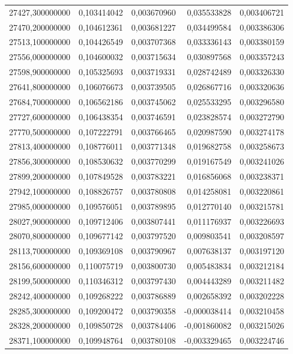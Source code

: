\begin{longtable}{rrrrr}
27427,300000000 & 0,103414042 & 0,003670960 & 0,035533828 & 0,003406721\\
27470,200000000 & 0,104612361 & 0,003681227 & 0,034499584 & 0,003386306\\
27513,100000000 & 0,104426549 & 0,003707368 & 0,033336143 & 0,003380159\\
27556,000000000 & 0,104600032 & 0,003715634 & 0,030897568 & 0,003357243\\
27598,900000000 & 0,105325693 & 0,003719331 & 0,028742489 & 0,003326330\\
27641,800000000 & 0,106076673 & 0,003739505 & 0,026867716 & 0,003320636\\
27684,700000000 & 0,106562186 & 0,003745062 & 0,025533295 & 0,003296580\\
27727,600000000 & 0,106438354 & 0,003746591 & 0,023828574 & 0,003272790\\
27770,500000000 & 0,107222791 & 0,003766465 & 0,020987590 & 0,003274178\\
27813,400000000 & 0,108776011 & 0,003771348 & 0,019682758 & 0,003258673\\
27856,300000000 & 0,108530632 & 0,003770299 & 0,019167549 & 0,003241026\\
27899,200000000 & 0,107849528 & 0,003783221 & 0,016856068 & 0,003238371\\
27942,100000000 & 0,108826757 & 0,003780808 & 0,014258081 & 0,003220861\\
27985,000000000 & 0,109576051 & 0,003789895 & 0,012770140 & 0,003215781\\
28027,900000000 & 0,109712406 & 0,003807441 & 0,011176937 & 0,003226693\\
28070,800000000 & 0,109677142 & 0,003797520 & 0,009803541 & 0,003208597\\
28113,700000000 & 0,109369108 & 0,003790967 & 0,007638137 & 0,003197120\\
28156,600000000 & 0,110075719 & 0,003800730 & 0,005483834 & 0,003212184\\
28199,500000000 & 0,110346312 & 0,003797430 & 0,004443289 & 0,003211482\\
28242,400000000 & 0,109268222 & 0,003786889 & 0,002658392 & 0,003202228\\
28285,300000000 & 0,109200472 & 0,003790358 & -0,000038414 & 0,003210458\\
28328,200000000 & 0,109850728 & 0,003784406 & -0,001860082 & 0,003215026\\
28371,100000000 & 0,109948764 & 0,003780108 & -0,003329465 & 0,003224746\\

\end{longtable}
